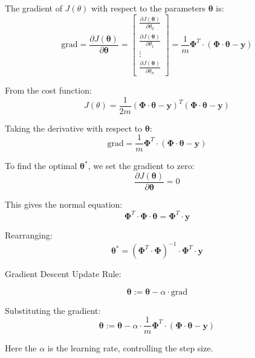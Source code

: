 The gradient of \(J(\theta)\) with respect to the parameters \(\boldsymbol{\theta}\) is:
\[
\text{grad} = \frac{\partial J(\boldsymbol{\theta})}{\partial \boldsymbol{\theta}} =
\begin{bmatrix}
\frac{\partial J(\boldsymbol{\theta})}{\partial \theta_0} \\
\frac{\partial J(\boldsymbol{\theta})}{\partial \theta_1} \\
\vdots \\
\frac{\partial J(\boldsymbol{\theta})}{\partial \theta_n}
\end{bmatrix}
= \frac{1}{m} \boldsymbol{\Phi}^T \cdot (\boldsymbol{\Phi} \cdot \boldsymbol{\theta} - \mathbf{y})
\]



From the cost function:
\[
J(\theta) = \frac{1}{2m} (\boldsymbol{\Phi} \cdot \boldsymbol{\theta} - \mathbf{y})^T (\boldsymbol{\Phi} \cdot \boldsymbol{\theta} - \mathbf{y})
\]

Taking the derivative with respect to \(\boldsymbol{\theta}\):
\[
\text{grad} = \frac{1}{m} \boldsymbol{\Phi}^T \cdot (\boldsymbol{\Phi} \cdot \boldsymbol{\theta} - \mathbf{y})
\]

To find the optimal \(\boldsymbol{\theta}^*\), we set the gradient to zero:
\[
\frac{\partial J(\boldsymbol{\theta})}{\partial \boldsymbol{\theta}} = 0
\]

This gives the normal equation:
\[
\boldsymbol{\Phi}^T \cdot \boldsymbol{\Phi} \cdot \boldsymbol{\theta} = \boldsymbol{\Phi}^T \cdot \mathbf{y}
\]

Rearranging:
\[
\boldsymbol{\theta}^* = (\boldsymbol{\Phi}^T \cdot \boldsymbol{\Phi})^{-1} \cdot \boldsymbol{\Phi}^T \cdot \mathbf{y}
\]


Gradient Descent Update Rule:

\[
\boldsymbol{\theta} := \boldsymbol{\theta} - \alpha \cdot \text{grad}
\]

Substituting the gradient:
\[
\boldsymbol{\theta} := \boldsymbol{\theta} - \alpha \cdot \frac{1}{m} \boldsymbol{\Phi}^T \cdot (\boldsymbol{\Phi} \cdot
\boldsymbol{\theta} - \mathbf{y})
\]

Here the \(\alpha\) is the learning rate, controlling the step size.

